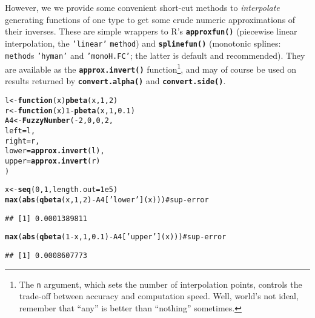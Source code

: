 \documentclass[11pt]{article}\usepackage{graphicx, color}
\makeatletter
\newcommand{\hlfunctioncall}[1]{\textcolor[rgb]{0.501960784313725,0,0.329411764705882}{\textbf{#1}}}%
\newcommand{\hlstring}[1]{\textcolor[rgb]{0.6,0.6,1}{#1}}%
\newcommand{\hlargument}[1]{\textcolor[rgb]{0.690196078431373,0.250980392156863,0.0196078431372549}{#1}}%
\newcommand{\hlcomment}[1]{\textcolor[rgb]{0.180392156862745,0.6,0.341176470588235}{#1}}%
\newenvironment{kframe}{%
 \def\at@end@of@kframe{}%
 \ifinner\ifhmode%
  \def\at@end@of@kframe{\end{minipage}}%
  \begin{minipage}{\columnwidth}%
 \fi\fi%
 \def\FrameCommand##1{\hskip\@totalleftmargin \hskip-\fboxsep
 \colorbox{shadecolor}{##1}\hskip-\fboxsep
     \hskip-\linewidth \hskip-\@totalleftmargin \hskip\columnwidth}%
 \MakeFramed {\advance\hsize-\width
   \@totalleftmargin\z@ \linewidth\hsize
   \@setminipage}}%
 {\par\unskip\endMakeFramed%
 \at@end@of@kframe}
\newenvironment{knitrout}{}{} %
\newcommand{\lang}[1]{\textsf{#1}\xspace}
\newcommand{\R}{\lang{R}}
\newcommand{\func}[1]{\texttt{\hlfunctioncall{#1}}}
\newcommand{\argument}[1]{\texttt{\hlargument{#1}}}
\newcommand{\str}[1]{\texttt{\hlstring{#1}}}
\makeatother
\begin{document}
However, we we provide some convenient short-cut methods
to \textit{interpolate} generating functions of one type
to get some crude numeric approximations of their inverses.
These are simple wrappers to \R's \func{approxfun()}
(piecewise linear interpolation,
the \str{'{}linear'{}} \argument{method})
and \func{splinefun()} (monotonic
splines: \argument{method}s \str{'{}hyman{}'}
and \str{'{}monoH.FC'{}}; the latter is
default and recommended).
They are available as the \func{approx.invert()}
function\footnote{The
\argument{n} argument, which sets the number of interpolation points,
controls the trade-off between accuracy and computation speed.
Well, world's not ideal, remember that ``any'' is better than ``nothing''
sometimes.}, and may
of course be used on results returned by
\func{convert.alpha()}
and \func{convert.side()}.


\begin{knitrout}\small
{}\color{fgcolor}\begin{kframe}
\begin{alltt}
l <- \hlfunctioncall{function}(x) \hlfunctioncall{pbeta}(x, 1, 2)
r <- \hlfunctioncall{function}(x) 1-\hlfunctioncall{pbeta}(x, 1, 0.1)
A4 <- \hlfunctioncall{FuzzyNumber}(-2, 0, 0, 2,
   left  = l,
   right = r,
   lower = \hlfunctioncall{approx.invert}(l),
   upper = \hlfunctioncall{approx.invert}(r)
)

x <- \hlfunctioncall{seq}(0,1,length.out=1e5)
\hlfunctioncall{max}(\hlfunctioncall{abs}(\hlfunctioncall{qbeta}(x, 1, 2) - A4[\hlstring{'lower'}](x)))     \hlcomment{# sup-error}
\end{alltt}
\begin{verbatim}
## [1] 0.0001389811
\end{verbatim}
\begin{alltt}
\hlfunctioncall{max}(\hlfunctioncall{abs}(\hlfunctioncall{qbeta}(1-x, 1, 0.1) - A4[\hlstring{'upper'}](x))) \hlcomment{# sup-error}
\end{alltt}
\begin{verbatim}
## [1] 0.0008607773
\end{verbatim}
\end{kframe}
\end{knitrout}
\end{document}

